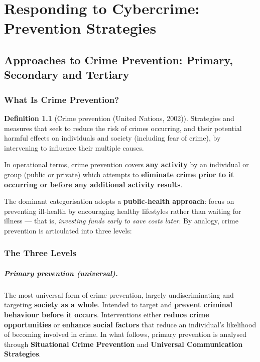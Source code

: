 \documentclass[11pt,a4paper,openany]{report}
\theoremstyle{definition}
\newtheorem{definition}{Definition}[chapter]
\theoremstyle{plain}
\theoremstyle{remark}
\begin{document}
\chapter{Responding to Cybercrime: Prevention Strategies}

\section{Approaches to Crime Prevention: Primary, Secondary and Tertiary}

\subsection{What Is Crime Prevention?}

\begin{definition}[Crime prevention (United Nations, 2002)]
Strategies and measures that seek to reduce the risk of crimes occurring, and their potential harmful effects on individuals and society (including fear of crime), by intervening to influence their multiple causes.
\end{definition}

In operational terms, crime prevention covers \textbf{any activity} by an individual or group (public or private) which attempts to \textbf{eliminate crime prior to it occurring or before any additional activity results}.

The dominant categorisation adopts a \textbf{public-health approach}: focus on preventing ill-health by encouraging healthy lifestyles rather than waiting for illness --- that is, \textit{investing funds early to save costs later}. By analogy, crime prevention is articulated into three levels:

\subsection{The Three Levels}

\paragraph{Primary prevention (universal).} The most universal form of crime prevention, largely undiscriminating and targeting \textbf{society as a whole}. Intended to target and \textbf{prevent criminal behaviour before it occurs}. Interventions either \textbf{reduce crime opportunities} or \textbf{enhance social factors} that reduce an individual's likelihood of becoming involved in crime. In what follows, primary prevention is analysed through \textbf{Situational Crime Prevention} and \textbf{Universal Communication Strategies}.
\end{document}
